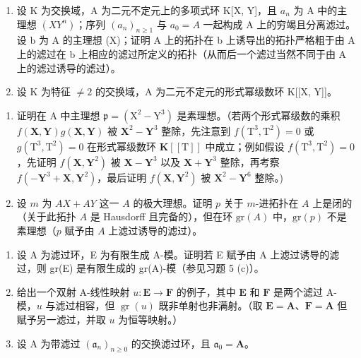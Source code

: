 
\begin{enumerate}
\def\labelenumi{\arabic{enumi}.}
\item
  设 K 为交换域，A 为二元不定元上的多项式环 K{[}X, Y{]}，且 \(a_{n}\) 为 A 中的主理想 \((XY^{n})\)；序列 \((a_{n})_{n\geqslant1}\) 与 \(a_{0}=A\) 一起构成 A 上的穷竭且分离滤过。设 b 为 A 的主理想 (X)；证明 A 上的拓扑在 b 上诱导出的拓扑严格粗于由 A 上的滤过在 b 上相应的滤过所定义的拓扑（从而后一个滤过当然不同于由 A 上的滤过诱导的滤过）。
\item
  设 K 为特征 \(\neq2\) 的交换域，A 为二元不定元的形式幂级数环 K{[}{[}X, Y{]}{]}。
\end{enumerate}

\begin{enumerate}
\def\labelenumi{(\alph{enumi})}
\item
  证明在 A 中主理想 \(\mathfrak{p} = (\mathrm{X}^2 -\mathrm{Y}^3)\) 是素理想。（若两个形式幂级数的乘积 \(f(\mathbf{X},\mathbf{Y})g(\mathbf{X},\mathbf{Y})\) 被 \(\mathbf{X}^2 -\mathbf{Y}^3\) 整除，先注意到 \(f(\mathrm{T}^3,\mathrm{T}^2) = 0\) 或 \(g(\mathrm{T}^3,\mathrm{T}^2) = 0\) 在形式幂级数环 \(\mathbf{K}[[\mathrm{T}]]\) 中成立；例如假设 \(f(\mathrm{T}^3,\mathrm{T}^2) = 0\)，先证明 \(f(\mathbf{X},\mathbf{Y}^2)\) 被 \(\mathbf{X} - \mathbf{Y}^3\) 以及 \(\mathbf{X} + \mathbf{Y}^3\) 整除，再考察 \(f(-\mathbf{Y}^3 +\mathbf{X},\mathbf{Y}^2)\)，最后证明 \(f(\mathbf{X},\mathbf{Y}^2)\) 被 \(\mathbf{X}^2 -\mathbf{Y}^6\) 整除。)
\item
  设 \(m\) 为 \(AX + AY\) 这一 \(A\) 的极大理想。证明 \(p\) 关于 \(m\)-进拓扑在 \(A\) 上是闭的（关于此拓扑 \(A\) 是 Hausdorff 且完备的），但在环 \(\text{gr}(A)\) 中，\(\text{gr}(p)\) 不是素理想（\(p\) 赋予由 \(A\) 上滤过诱导的滤过）。
\end{enumerate}

\begin{enumerate}
\def\labelenumi{\arabic{enumi}.}
\setcounter{enumi}{2}
\item
  设 A 为滤过环，E 为有限生成 A-模。证明若 E 赋予由 A 上滤过诱导的滤过，则 gr(E) 是有限生成的 gr(A)-模（参见习题 5 (c)）。~
\item
  给出一个双射 A-线性映射 \(u \colon \mathbf{E} \to \mathbf{F}\) 的例子，其中 \(\mathbf{E}\) 和 \(\mathbf{F}\) 是两个滤过 A-模，\(u\) 与滤过相容，但 \(\operatorname{gr}(u)\) 既非单射也非满射。（取 \(\mathbf{E} = \mathbf{A}\)、\(\mathbf{F} = \mathbf{A}\) 但赋予另一滤过，并取 \(u\) 为恒等映射。）
\item
  设 A 为带滤过 \((\mathfrak{a}_n)_{n\geqslant 0}\) 的交换滤过环，且 \(\mathfrak{a}_0 = \mathbf{A}\)。
\end{enumerate}

